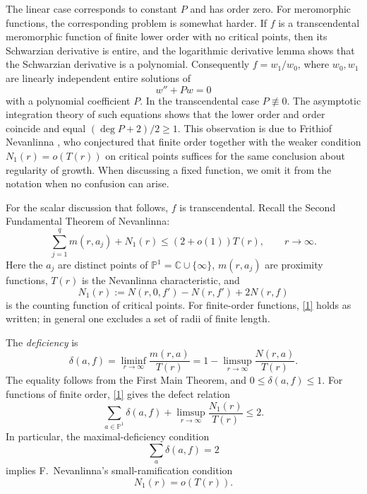 \documentclass[12pt,letterpaper,reqno]{amsart}
\theoremstyle{definition}
\numberwithin{equation}{section}
\newcommand{\C}{\mathbb C}
\newcommand{\PP}{\mathbb P}
\begin{document}
The linear case corresponds to constant $P$ and has order zero.
 For meromorphic functions, the
corresponding problem is somewhat harder. If $f$ is a transcendental
meromorphic function of finite lower order with no critical points, then
its Schwarzian derivative is entire, and the logarithmic derivative
lemma shows that the Schwarzian derivative is a polynomial. Consequently $f=w_1/w_0$, where
$w_0,w_1$ are linearly independent entire solutions of
\[
 w''+Pw=0
\]
with a polynomial coefficient $P$. In the transcendental case $P\not\equiv0$.
The asymptotic integration theory of such equations \cite{Was65} shows
that the lower order and order coincide and equal
$(\deg P+2)/2\geq1$.
This observation is due to Frithiof Nevanlinna \cite{Nev30}, who conjectured
that finite order together with the weaker condition
$N_1(r)=o(T(r))$ on critical points suffices for the same conclusion about
regularity of growth. When discussing a fixed function, we omit it from
the notation when no confusion can arise.

For the scalar discussion that follows, $f$ is transcendental.
Recall the Second Fundamental Theorem of Nevanlinna:
\begin{equation}\label{1}
 \sum_{j=1}^q m(r,a_j)+N_1(r)\leq(2+o(1))T(r),\qquad r\to\infty.
\end{equation}
Here the $a_j$ are distinct points of $\PP^1=\C\cup\{\infty\}$,
$m(r,a_j)$ are proximity functions, $T(r)$ is the Nevanlinna
characteristic, and
\[
 N_1(r):=N(r,0,f')-N(r,f')+2N(r,f)
\]
is the counting function of critical points. For finite-order functions,
\eqref{1} holds as written; in general one excludes a set of radii of
finite length.

The \emph{deficiency} is
\[
 \delta(a,f)=\liminf_{r\to\infty}\frac{m(r,a)}{T(r)}
 =1-\limsup_{r\to\infty}\frac{N(r,a)}{T(r)}.
\]
The equality follows from the First Main Theorem, and
$0\leq\delta(a,f)\leq1$. For functions of finite order, \eqref{1} gives
the defect relation
\begin{equation}\label{2}
 \sum_{a\in\PP^1}\delta(a,f)
 +\limsup_{r\to\infty}\frac{N_1(r)}{T(r)}\leq2.
\end{equation}
In particular, the maximal-deficiency condition
\begin{equation}\label{sum}
 \sum_a\delta(a,f)=2
\end{equation}
implies F.~Nevanlinna's small-ramification condition
\begin{equation}\label{smal}
 N_1(r)=o(T(r)).
\end{equation}
\end{document}
